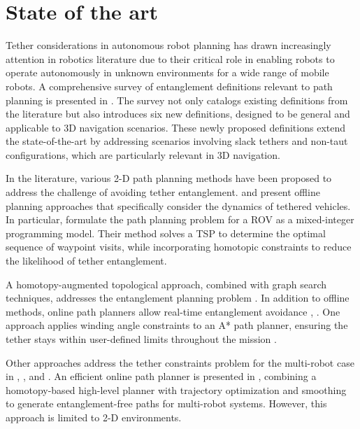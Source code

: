 \section{State of the art}
\label{sec:related_work}


Tether considerations in autonomous robot planning has drawn increasingly attention in robotics literature due to their critical role in enabling robots to operate autonomously in unknown environments for a wide range of mobile robots. A comprehensive survey of entanglement definitions relevant to path planning is presented in \cite{definitions}. The survey not only catalogs existing definitions from the literature but also introduces six new definitions, designed to be general and applicable to 3D navigation scenarios.  These newly proposed definitions extend the state-of-the-art by addressing scenarios involving slack tethers and non-taut configurations, which are particularly relevant in 3D navigation.   

In the literature, various 2-D path planning methods have been proposed to address the challenge of avoiding tether entanglement. \cite{rov_mccammon} and \cite{mechsy2017novel} present offline planning approaches that specifically consider the dynamics of tethered vehicles. In particular, \cite{mechsy2017novel} formulate the path planning problem for a \ac{ROV} as a mixed-integer programming model. Their method solves a \ac{TSP} to determine the optimal sequence of waypoint visits, while incorporating homotopic constraints to reduce the likelihood of tether entanglement.

A homotopy-augmented topological approach, combined with graph search techniques, addresses the entanglement planning problem \cite{kim}. In addition to offline methods, online path planners allow real-time entanglement avoidance \cite{kim}, \cite{withy}. One approach applies winding angle constraints to an A* path planner, ensuring the tether stays within user-defined limits throughout the mission \cite{withy}.

Other approaches address the tether constraints problem for the multi-robot case in \cite{zhang2019planning}, \cite{hert1996ties}, and \cite{cao2023neptune}. An efficient online path planner is presented in \cite{cao2023neptune}, combining a homotopy-based high-level planner with trajectory optimization and smoothing to generate entanglement-free paths for multi-robot systems. However, this approach is limited to 2-D environments. 

